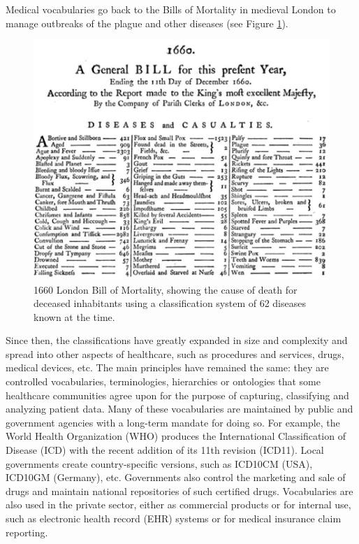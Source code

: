 \documentclass[11pt]{book}
\theoremstyle{definition}
\theoremstyle{definition}
\theoremstyle{definition}
\theoremstyle{remark}
\begin{document}
Medical vocabularies go back to the Bills of Mortality in medieval
London to manage outbreaks of the plague and other diseases (see Figure
\ref{fig:bill}). 

\begin{figure}

{\centering \includegraphics[width=1\linewidth]{images/StandardizedVocabularies/bill} 

}

\caption{1660 London Bill of Mortality, showing the cause of death for deceased inhabitants using a classification system of 62 diseases known at the time.}\label{fig:bill}
\end{figure}

Since then, the classifications have greatly expanded in size and
complexity and spread into other aspects of healthcare, such as
procedures and services, drugs, medical devices, etc. The main
principles have remained the same: they are controlled vocabularies,
terminologies, hierarchies or ontologies that some healthcare
communities agree upon for the purpose of capturing, classifying and
analyzing patient data. Many of these vocabularies are maintained by
public and government agencies with a long-term mandate for doing so.
For example, the World Health Organization (WHO) produces the
International Classification of Disease (ICD) with the recent addition
of its 11th revision (ICD11). Local governments create country-specific
versions, such as ICD10CM (USA), ICD10GM (Germany), etc. Governments
also control the marketing and sale of drugs and maintain national
repositories of such certified drugs. Vocabularies are also used in the
private sector, either as commercial products or for internal use, such
as electronic health record (EHR) systems or for medical insurance claim
reporting.
\end{document}

